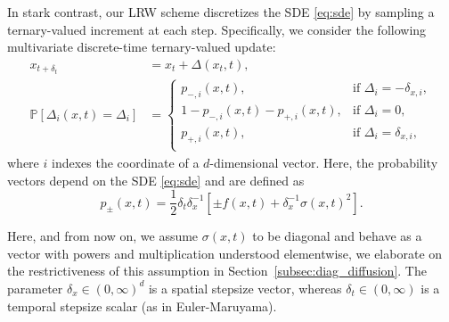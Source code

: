 \documentclass[pra,showpacs,amsmath,amssymb,amsfonts,lengthcheck,longbibliography,onecolumn]{revtex4-2}
\begin{document}
In stark contrast, our LRW scheme discretizes the SDE \eqref{eq:sde} by sampling a ternary-valued increment at each step.
Specifically, we consider the following multivariate discrete-time ternary-valued update:
\begin{align}
    x_{t+\delta_t} &= 
    x_t + \Delta(x_t, t), \nonumber \\
    \mathbb{P}[\Delta_i(x, t) = \Delta_i]
    &=
    \begin{cases}
        p_{-,i}(x,t), &\text{if } \Delta_i = -\delta_{x,i}, \\
        1 - p_{-,i}(x,t) - p_{+,i}(x,t), &\text{if } \Delta_i = 0, \\
        p_{+,i}(x,t), &\text{if } \Delta_i = \delta_{x,i}, \\
    \end{cases} \label{eq:lrw}
\end{align}
where $i$ indexes the coordinate of a $d$-dimensional vector. Here, the probability vectors depend on the SDE \eqref{eq:sde} and are defined as
\begin{equation}\label{eq:ternary-p}
    p_\pm(x, t) = \frac{1}{2} \delta_t\delta_x^{-1} \left[\pm f(x, t) +\delta_x^{-1}\sigma(x, t)^2\right].
\end{equation}

Here, and from now on, we assume $\sigma(x,t)$ to be diagonal and behave as a vector with powers and multiplication understood elementwise, we elaborate on the restrictiveness of this assumption in Section~\ref{subsec:diag_diffusion}.
The parameter $\delta_x \in (0, \infty)^{d}$ is a spatial stepsize vector, whereas $\delta_t \in (0, \infty) $ is a temporal stepsize scalar (as in Euler-Maruyama).
\end{document}

